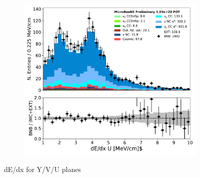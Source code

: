\begin{figure}[H]
\begin{center}
\begin{subfigure}[b]{0.3\textwidth}
    \caption{}
    \end{subfigure}
    \begin{subfigure}[b]{0.3\textwidth}
    \centering
    \includegraphics[width=1.00\textwidth]{pi0/calorimetry/shr_tkfit_dedx_U_03112020_ALL_scaled.pdf}
    \caption{}
    \end{subfigure}
\caption{dE/dx for Y/V/U planes}
\label{fig:pi0:calorimetry:dedx}
\end{center}
\end{figure}

